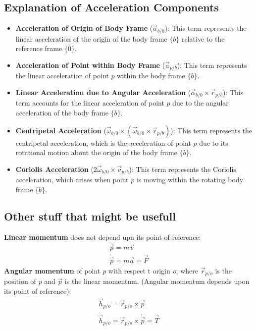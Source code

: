 \subsection{Explanation of Acceleration Components}

\begin{itemize}
    \item \textbf{Acceleration of Origin of Body Frame} (\( \vec{a}_{b/0} \)): This term represents the linear acceleration of the origin of the body frame \( \{b\} \) relative to the reference frame \( \{0\} \).
    \item \textbf{Acceleration of Point within Body Frame} (\( \vec{a}_{p/b} \)): This term represents the linear acceleration of point \( p \) within the body frame \( \{b\} \).
    \item \textbf{Linear Acceleration due to Angular Acceleration} (\( \vec{\alpha}_{b/0} \times \vec{r}_{p/b} \)): This term accounts for the linear acceleration of point \( p \) due to the angular acceleration of the body frame \( \{b\} \).
    \item \textbf{Centripetal Acceleration} (\( \vec{\omega}_{b/0} \times (\vec{\omega}_{b/0} \times \vec{r}_{p/b}) \)): This term represents the centripetal acceleration, which is the acceleration of point \( p \) due to its rotational motion about the origin of the body frame \( \{b\} \).
    \item \textbf{Coriolis Acceleration} (\( 2 \vec{\omega}_{b/0} \times \vec{v}_{p/b} \)): This term represents the Coriolis acceleration, which arises when point \( p \) is moving within the rotating body frame \( \{b\} \).
\end{itemize}



\subsection{Other stuff that might be usefull}
\textbf{Linear momentum} does not depend upn its point of reference:
\begin{subequations}
    \begin{align}
        \vec{p} = m\vec{v} \\
        \dot{\vec{p}} = m\vec{a} = \vec{F}
    \end{align}
\end{subequations}
\textbf{Angular momentum} of point \textit{p} with respect t origin \textit{o}, where $\vec{r}_{p/o}$ is the position of \textit{p} and $\vec{p}$ is the linear momentum. (Angular momentum depends upon its point of reference):
\begin{subequations}
    \begin{align}
        \vec{h}_{p/o} = \vec{r}_{p/o} \times \vec{p} \\
        \dot{\vec{h}}_{p/o} = \vec{r}_{p/o} \times \dot{\vec{p}} = \vec{T}
    \end{align}
\end{subequations}